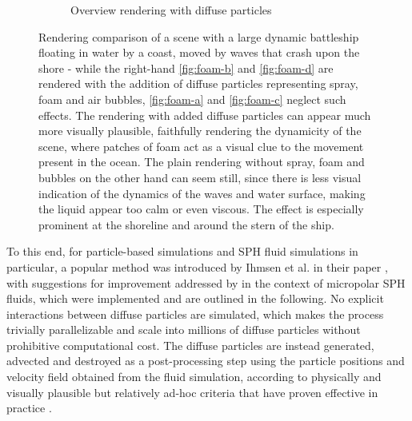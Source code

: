 \documentclass[oneside, a4paper]{book}
\begin{document}
\begin{figure}
\begin{subfigure}[t][0.5\textwidth]{0.5\textwidth}
      \caption{Overview rendering with diffuse particles}
      \label{fig:foam-d}
    \end{subfigure}
    \vspace{0.5cm}
    \caption{Rendering comparison of a scene with a large dynamic battleship floating in water by a coast, moved by waves that crash upon the shore - while the right-hand \autoref{fig:foam-b} and \autoref{fig:foam-d} are rendered with the addition of diffuse particles representing spray, foam and air bubbles, \autoref{fig:foam-a} and \autoref{fig:foam-c} neglect such effects. The rendering with added diffuse particles can appear much more visually plausible, faithfully rendering the dynamicity of the scene, where patches of foam act as a visual clue to the movement present in the ocean. The plain rendering without spray, foam and bubbles on the other hand can seem still, since there is less visual indication of the dynamics of the waves and water surface, making the liquid appear too calm or even viscous. The effect is especially prominent at the shoreline and around the stern of the ship.}
    \label{fig:foam-with-without}
  \end{figure}
  
  To this end, for particle-based simulations and SPH fluid simulations in particular, a popular method was introduced by Ihmsen et al. in their paper \autocite[Unified Spray, Foam and Bubbles for Particle-Based Fluids]{spray-foam-bubbles}, with suggestions for improvement addressed by \autocite[Bender et al.]{turbulent-micropolar-foam} in the context of micropolar SPH fluids, which were implemented and are outlined in the following. No explicit interactions between diffuse particles are simulated, which makes the process trivially parallelizable and scale into millions of diffuse particles without prohibitive computational cost. The diffuse particles are instead generated, advected and destroyed as a post-processing step using the particle positions and velocity field obtained from the fluid simulation, according to physically and visually plausible but relatively ad-hoc criteria that have proven effective in practice \autocites{turbulent-micropolar-foam}{unified-spray-foam-bubbles}.
\end{document}
